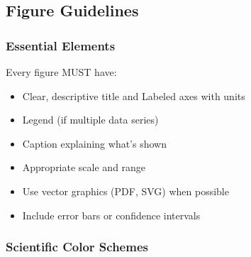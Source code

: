 \documentclass[11pt,a4paper]{article}
\begin{document}
\subsection{Figure Guidelines}

\subsubsection{Essential Elements}
Every figure MUST have:
\begin{itemize}
    \item Clear, descriptive title and Labeled axes with units
    \item Legend (if multiple data series)
    \item Caption explaining what's shown
    \item Appropriate scale and range
    \item Use vector graphics (PDF, SVG) when possible
    \item Include error bars or confidence intervals
\end{itemize}


\subsubsection{Scientific Color Schemes}
\end{document}
